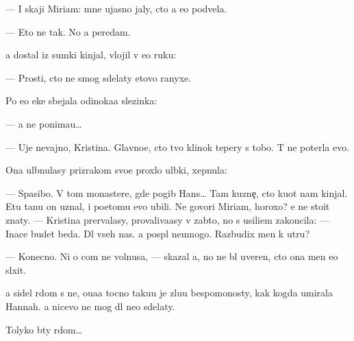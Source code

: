 \documentclass[10pt]{book}
\begin{document}
— I skaji Miriam: mne ujasno jaly, cto {\y}a {\y}e{\y}o podvela.

— Eto ne tak. No {\y}a peredam.

{\Y}a dostal iz sumki kinjal, vlojil v {\y}e{\y}o ruku:

— Prosti, cto ne smog sdelaty etovo ranyxe.

Po {\y}e{\y}o {\x}eke sbejala odinoka{\y}a slezinka:

— {\Y}a ne ponima{\y}u…

— Uje nevajno, Kristina. Glavno{\y}e, cto tvo{\y} klinok tepery s tobo{\y}. T{\yi} ne poter{\ia}la {\y}evo.

Ona ul{\yi}bnulasy prizrakom svo{\y}e{\y} proxlo{\y} ul{\yi}bki, xepnula:

— Spasibo. V tom monastere, gde pogib Hans… Tam kuzne{\c}, cto ku{\y}ot nam kinjal{\yi}. Etu ta{\y}nu on uznal, i poetomu {\y}evo ubili. Ne govori Miriam, horoxo? {\Y}e{\y} ne stoit znaty. — Kristina prervalasy, provaliva{\y}asy v zab{\yi}t{\y}o, no s usili{\y}em zakoncila: — Inace budet beda. Dl{\ia} vseh nas. {\Y}a pospl{\io} nemnogo. Razbudix men{\ia} k utru?

— Konecno. Ni o com ne volnu{\y}sa, — skazal {\y}a, no ne b{\yi}l uveren, cto ona men{\ia} {\y}e{\x}o sl{\yi}xit.

{\Y}a sidel r{\ia}dom s ne{\y}, o{\x}u{\x}a{\y}a tocno taku{\y}u je zlu{\y}u bespomo{\x}nosty, kak kogda umirala Hannah. {\Y}a nicevo ne mog dl{\ia} ne{\y}o sdelaty.

Tolyko b{\yi}ty r{\ia}dom…
\end{document}
